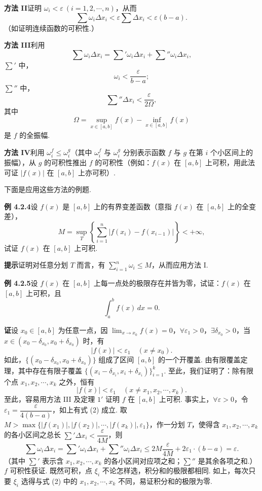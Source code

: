 \documentclass[UTF8, 12pt, fontset=fandol, oneside]{ctexart}
\begin{document}
\noindent\textbf{方法 II}\quad 证明 $\omega_i<\varepsilon\ (i=1,2,\cdots,n)$，从而
\[
\sum\omega_i\Delta x_i<\varepsilon\sum\Delta x_i<\varepsilon(b-a).
\]
（如证明连续函数的可积性.）

\noindent\textbf{方法 III}\quad 利用
\[
\sum\omega_i\Delta x_i=\sum'\omega_i\Delta x_i+\sum''\omega_i\Delta x_i,
\]
$\sum'$ 中，
\[
\omega_i<\frac{\varepsilon}{b-a};
\]
$\sum''$ 中，
\[
\sum''\Delta x_i<\frac{\varepsilon}{2\Omega},
\]
其中
\[
\Omega=\sup_{x\in[a,b]}f(x)-\inf_{x\in[a,b]}f(x)
\]
是 $f$ 的全振幅.

\noindent\textbf{方法 IV}\quad 利用 $\omega_i^f\le\omega_i^g$（其中 $\omega_i^f$ 与 $\omega_i^g$ 分别表示函数 $f$ 与 $g$ 在第 $i$ 个小区间上的振幅），从 $g$ 的可积性推出 $f$ 的可积性（例如：$f(x)$ 在 $[a,b]$ 上可积，用此法可证
 $|f(x)|$ 在 $[a,b]$ 上亦可积）.

下面是应用这些方法的例题.

\noindent\textbf{例 4.2.4}\quad 设 $f(x)$ 是 $[a,b]$ 上的有界变差函数（意指 $f(x)$ 在 $[a,b]$ 上的全变差），
\[
M=\sup_T\left\{\sum_{i=1}^n|f(x_i)-f(x_{i-1})|\right\}<+\infty,
\]
试证 $f(x)$ 在 $[a,b]$ 上可积.

\noindent\textbf{提示}\quad 证明对任意分划 $T$ 而言，有 $\sum_{i=1}^n\omega_i\le M$，从而应用方法 I.

\noindent\textbf{例 4.2.5}\quad 设 $f(x)$ 在 $[a,b]$ 上每一点处的极限存在并皆为零，试证：$f(x)$ 在 $[a,b]$ 上可积，且
\[
\int_a^b f(x)\,dx=0.
\]

\noindent\textbf{证}\quad 设 $x_0\in[a,b]$ 为任意一点，因 $\lim_{x\to x_0}f(x)=0$，$\forall\varepsilon_1>0$，$\exists\delta_{x_0}>0$，当 $x\in(x_0-\delta_{x_0},x_0+\delta_{x_0})$ 时，有
\[
|f(x)|<\varepsilon_1\quad(x\ne x_0).
\tag{1}
\]
如此，$\{(x_0-\delta_{x_0},x_0+\delta_{x_0})\}$ 组成了区间 $[a,b]$ 的一个开覆盖. 由有限覆盖定理，其中存在有限子覆盖 $\{(x_i-\delta_{x_i},x_i+\delta_{x_i})\}_{i=1}^k$. 至此，我们证明了：除有限个点 $x_1,x_2,\cdots,x_k$ 之外，恒有
\[
|f(x)|<\varepsilon_1\quad(x\ne x_1,x_2,\cdots,x_k).
\tag{2}
\]
至此，容易用方法 III 及定理 $1'$ 证明 $f$ 在 $[a,b]$ 上可积. 事实上，$\forall\varepsilon>0$，令 $\varepsilon_1=\dfrac{\varepsilon}{4(b-a)}$，如上有式 (2) 成立. 取 $M>\max\{|f(x_1)|,|f(x_2)|,\cdots,|f(x_k)|,\varepsilon_1\}$，作一分划 $T$，使得含 $x_1,x_2,\cdots,x_k$ 的各小区间之总长 $\sum'\Delta x_i<\dfrac{\varepsilon}{4M}$，则
\[
\sum\omega_i\Delta x_i
=\sum'\omega_i\Delta x_i+\sum''\omega_i\Delta x_i
\le 2M\frac{\varepsilon}{4M}+2\varepsilon_1\cdot(b-a)=\varepsilon.
\]
（其中 $\sum'$ 表示含 $x_1,x_2,\cdots,x_k$ 的各小区间对应项之和；$\sum''$ 是其余各项之和.）$f$ 可积性获证. 既然可积，点 $\xi_i$ 不论怎样选，积分和的极限都相同. 如上，每次只要 $\xi_i$ 选得与式 (2) 中的 $x_1,x_2,\cdots,x_k$ 不同，易证积分和的极限为零.
\end{document}
